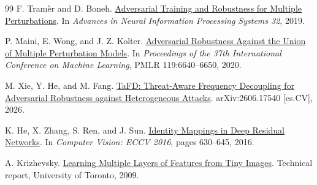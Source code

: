 \documentclass{article}
\begin{document}
\begin{thebibliography}{99}
F. Tram\`er and D. Boneh.
\newblock \href{https://proceedings.neurips.cc/paper_files/paper/2019/hash/5d4ae76f053f8f2516ad12961ef7fe97-Abstract.html}{Adversarial Training and Robustness for Multiple Perturbations}.
\newblock In \emph{Advances in Neural Information Processing Systems 32}, 2019.

P. Maini, E. Wong, and J. Z. Kolter.
\newblock \href{https://proceedings.mlr.press/v119/maini20a.html}{Adversarial Robustness Against the Union of Multiple Perturbation
Models}.
\newblock In \emph{Proceedings of the 37th International Conference on Machine
Learning}, PMLR 119:6640--6650, 2020.

M. Xie, Y. He, and M. Fang.
\newblock \href{https://arxiv.org/abs/2606.17540}{TaFD: Threat-Aware Frequency Decoupling for Adversarial Robustness
against Heterogeneous Attacks}.
\newblock arXiv:2606.17540 [cs.CV], 2026.

K. He, X. Zhang, S. Ren, and J. Sun.
\newblock \href{https://doi.org/10.1007/978-3-319-46493-0_38}{Identity Mappings in Deep Residual Networks}.
\newblock In \emph{Computer Vision: ECCV 2016}, pages 630--645, 2016.

A. Krizhevsky.
\newblock \href{https://www.cs.toronto.edu/~kriz/cifar.html}{Learning Multiple Layers of Features from Tiny Images}.
\newblock Technical report, University of Toronto, 2009.

\end{thebibliography}
\end{document}
